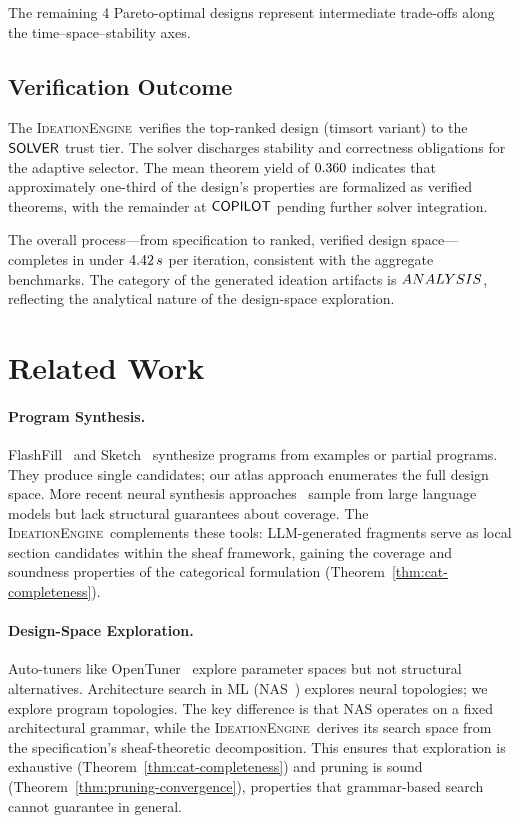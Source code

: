 \documentclass[11pt]{article}
\newcommand{\IdeationEngine}{\textsc{IdeationEngine}}
\begin{document}
The remaining 4 Pareto-optimal designs represent intermediate
trade-offs along the time--space--stability axes.

\subsection{Verification Outcome}

The \IdeationEngine\ verifies the top-ranked design (timsort variant)
to the $\mathsf{SOLVER}$ trust tier.  The solver discharges stability and
correctness obligations for the adaptive selector.  The mean
theorem yield of $0.360$ indicates that approximately
one-third of the design's properties are formalized as verified
theorems, with the remainder at $\mathsf{COPILOT}$ pending further
solver integration.

The overall process---from specification to ranked, verified design
space---completes in under $4.42\,s$ per iteration,
consistent with the aggregate benchmarks.  The category of the
generated ideation artifacts is $ANALYSIS$, reflecting
the analytical nature of the design-space exploration.

\section{Related Work}\label{sec:related}

\paragraph{Program Synthesis.}
FlashFill~\cite{Gulwani2011} and Sketch~\cite{Solar-Lezama2008}
synthesize programs from examples or partial programs.  They produce
single candidates; our atlas approach enumerates the full design space.
More recent neural synthesis approaches~\cite{CodeGen2022} sample from
large language models but lack structural guarantees about coverage.
The \IdeationEngine\ complements these tools: LLM-generated fragments
serve as local section candidates within the sheaf framework, gaining
the coverage and soundness properties of the categorical formulation
(Theorem~\ref{thm:cat-completeness}).

\paragraph{Design-Space Exploration.}
Auto-tuners like OpenTuner~\cite{Ansel2014} explore parameter spaces
but not structural alternatives.  Architecture search in ML
(NAS~\cite{Zoph2017}) explores neural topologies; we explore program
topologies.  The key difference is that NAS operates on a fixed
architectural grammar, while the \IdeationEngine\ derives its search
space from the specification's sheaf-theoretic decomposition.  This
ensures that exploration is exhaustive (Theorem~\ref{thm:cat-completeness})
and pruning is sound (Theorem~\ref{thm:pruning-convergence}), properties
that grammar-based search cannot guarantee in general.
\end{document}
